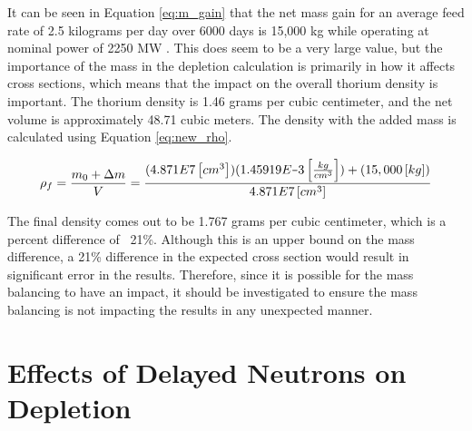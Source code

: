 It can be seen in Equation \eqref{eq:m_gain} that the net mass gain for an average feed rate of 2.5 kilograms per day over 6000 days is 15,000 kg \cite{rykhlevskii_fuel_2020, betzler_molten_2017} while operating at nominal power of 2250 MW \cite{robertson_conceptual_1971}. This does seem to be a very large value, but the importance of the mass in the depletion calculation is primarily in how it affects cross sections, which means that the impact on the overall thorium density is important. The thorium density is 1.46 grams per cubic centimeter, and the net volume is approximately 48.71 cubic meters. The density with the added mass is calculated using Equation \eqref{eq:new_rho}.

\begin{equation} \hfill
\rho_f = \frac{m_0 + \Delta m}{V} = \frac{(4.871E7 \left[cm^3 \right])(1.45919E\minus3 \left[ \frac{kg}{cm^3} \right]) + (15,000 \left[ kg \right])}{4.871E7 \left[ cm^3 \right]}
\hfill\label{eq:new_rho} \end{equation}

The final density comes out to be 1.767 grams per cubic centimeter, which is a percent difference of ~21\%. Although this is an upper bound on the mass difference, a 21\% difference in the expected cross section would result in significant error in the results. Therefore, since it is possible for the mass balancing to have an impact, it should be investigated to ensure the mass balancing is not impacting the results in any unexpected manner.









\section{Effects of Delayed Neutrons on Depletion}

